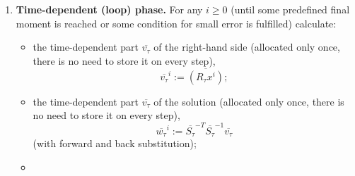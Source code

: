 \begin{algorithm}
\begin{enumerate}
\begin{itemize}
\begin{equation}
            j \in \overline{I};
          \end{equation}
        \item
          the Cholesky decomposition
          \begin{equation}
            \overline{L_\tau} = \overline{S_\tau} \overline{S_\tau}^T,
          \end{equation}
          where $\overline{S_\tau}$ is lower-triangular sparse matrix;
        \item
          the time independent part of the restricted solution
          \begin{equation}
            \overline{z_\tau}
            := \overline{L_\tau}^{-1} \overline{c_\tau}
            = \overline{S_\tau}^{-T} \overline{S_\tau}^{-1} \overline{c_\tau}
          \end{equation}
          (of course, we do not find the inverses of $\overline{S_\tau}$ and its
          transpose but apply forward and back substitution);
        \item
          the initial coordinates $x^0 \in \R^{n_0}$ of the temperature,
          \begin{equation}
            x^0_j := u_0(N_i),\ j = 0, ..., n_0 - 1.
          \end{equation}
      \end{itemize}
    \item
      \textbf{Time-dependent (loop) phase.}
      For any $i \geq 0$ (until some predefined final moment is reached or some
      condition for small error is fulfilled) calculate:
      \begin{itemize}
        \item
          the time-dependent part $\overline{v_\tau}$ of the right-hand side
          (allocated only once, there is no need to store it on every step),
          \begin{equation}
            \overline{v_\tau}^i := \overline{(R_\tau x^i)};
          \end{equation}
        \item
          the time-dependent part $\overline{v_\tau}$ of the solution
          (allocated only once, there is no need to store it on every step),
          \begin{equation}
            \overline{w_\tau}^i :=
            \overline{S_\tau}^{-T} \overline{S_\tau}^{-1} \overline{v_\tau}
          \end{equation}
          (with forward and back substitution);
        \item

\end{itemize}
\end{enumerate}
\end{algorithm}
